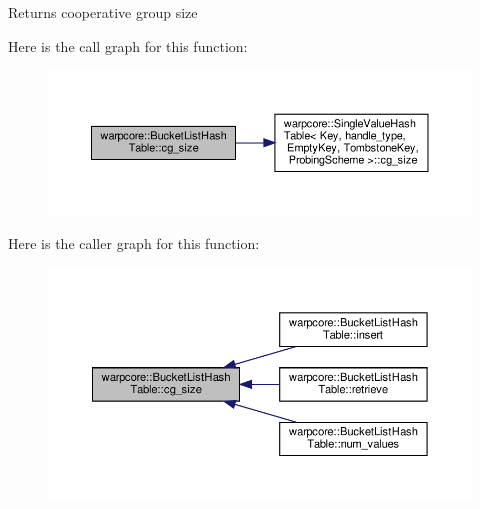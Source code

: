 \begin{DoxyReturn}{Returns}
cooperative group size 
\end{DoxyReturn}
Here is the call graph for this function\+:
\nopagebreak
\begin{figure}[H]
\begin{center}
\leavevmode
\includegraphics[width=350pt]{classwarpcore_1_1BucketListHashTable_a3807ac1b39b47617d862c5dd17f21330_cgraph}
\end{center}
\end{figure}
Here is the caller graph for this function\+:
\nopagebreak
\begin{figure}[H]
\begin{center}
\leavevmode
\includegraphics[width=350pt]{classwarpcore_1_1BucketListHashTable_a3807ac1b39b47617d862c5dd17f21330_icgraph}
\end{center}
\end{figure}
\mbox{\label{classwarpcore_1_1BucketListHashTable_ad2c7ebaba6144a640fe66bf09a184c21}} 
